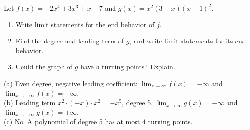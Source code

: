 \begin{exo}{}
Let $f(x)=-2x^4+3x^3+x-7$ and $g(x)=x^2(3-x)(x+1)^2$.
\begin{enumerate}[label=(\alph*)]
\item Write limit statements for the end behavior of $f$.
\item Find the degree and leading term of $g$, and write limit statements for its end behavior.
\item Could the graph of $g$ have 5 turning points? Explain.
\end{enumerate}
\begin{solution}
(a) Even degree, negative leading coefficient: $\lim_{x\to\infty}f(x)=-\infty$ and $\lim_{x\to-\infty}f(x)=-\infty$.\\
(b) Leading term $x^2\cdot(-x)\cdot x^2=-x^5$, degree 5. $\lim_{x\to\infty}g(x)=-\infty$ and $\lim_{x\to-\infty}g(x)=+\infty$.\\
(c) No. A polynomial of degree 5 has at most $4$ turning points.
\end{solution}
\end{exo}

